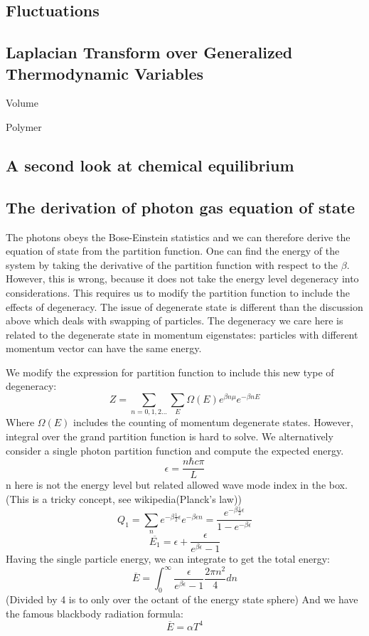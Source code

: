 \documentclass[12pt, oneside]{article}   	%
\begin{document}
\subsection{Fluctuations}


\subsection{Laplacian Transform over Generalized Thermodynamic Variables}
\par 
Volume

Polymer

\subsection{A second look at chemical equilibrium }


\subsection{The derivation of photon gas equation of state}
\par 
The photons obeys the Bose-Einstein statistics and we can therefore derive the equation of state from the partition function. One can find the energy of the system by taking the derivative of the partition function with respect to the $\beta$. However, this is wrong, because it does not take the energy level degeneracy into considerations. This requires us to modify the partition function to include the effects of degeneracy. The issue of degenerate state is different than the discussion above which deals with swapping of particles. The degeneracy we care here is related to the degenerate state in momentum eigenstates: particles with different momentum vector can have the same energy.
\par
We modify the expression for partition function to include this new type of degeneracy:
$$Z =  \sum_{n = 0,1,2...} \sum_{E} \Omega(E) e^{\beta n \mu} e^{-\beta n E} $$
Where $\Omega(E)$ includes the counting of momentum degenerate states. However, integral over the grand partition function is hard to solve. We alternatively consider a single photon partition function and compute the expected energy.
$$\epsilon = \frac{n \hbar  c  \pi }{L}  $$
n here is not the energy level but related allowed wave mode index in the box. (This is a tricky concept, see wikipedia(Planck's law))
$$Q_1 = \sum_n e^{- \beta \frac{1}{2} \epsilon} e^{-\beta {\epsilon n }} = \frac{e^{- \beta \frac{1}{2} \epsilon}} {1 - e^{-\beta \epsilon}}$$
$$\overline{E_1} = \epsilon + \frac{\epsilon}{e^{\beta \epsilon} -1 }$$
Having the single particle energy, we can integrate to get the total energy: 
$$\overline{E} = \int_{0}^{\infty} \frac{\epsilon}{e^{\beta \epsilon} -1 } \frac{2 \pi n^2}{ 4} dn $$
(Divided by 4 is to only over the octant of the energy state sphere)
And we have the famous blackbody radiation formula: 
$$\overline{E} = \alpha T^4$$
\end{document}
